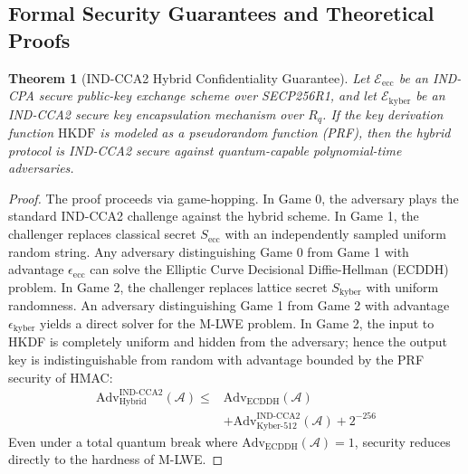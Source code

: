 \documentclass[pdflatex,sn-mathphys,Numbered]{sn-jnl}%
\theoremstyle{thmstyleone}%
\newtheorem{theorem}{Theorem}%
\theoremstyle{thmstyletwo}%
\theoremstyle{thmstylethree}%
\begin{document}
\subsection{\textbf{Formal Security Guarantees and Theoretical Proofs}}

\begin{theorem}[IND-CCA2 Hybrid Confidentiality Guarantee]
Let $\mathcal{E}_{\text{ecc}}$ be an IND-CPA secure public-key exchange scheme over SECP256R1, and let $\mathcal{E}_{\text{kyber}}$ be an IND-CCA2 secure key encapsulation mechanism over $R_q$. If the key derivation function $\text{HKDF}$ is modeled as a pseudorandom function (PRF), then the hybrid protocol is IND-CCA2 secure against quantum-capable polynomial-time adversaries.
\end{theorem}
\begin{proof}
The proof proceeds via game-hopping. In Game 0, the adversary plays the standard IND-CCA2 challenge against the hybrid scheme. In Game 1, the challenger replaces classical secret $S_{\text{ecc}}$ with an independently sampled uniform random string. Any adversary distinguishing Game 0 from Game 1 with advantage $\epsilon_{\text{ecc}}$ can solve the Elliptic Curve Decisional Diffie-Hellman (ECDDH) problem. In Game 2, the challenger replaces lattice secret $S_{\text{kyber}}$ with uniform randomness. An adversary distinguishing Game 1 from Game 2 with advantage $\epsilon_{\text{kyber}}$ yields a direct solver for the M-LWE problem. In Game 2, the input to HKDF is completely uniform and hidden from the adversary; hence the output key is indistinguishable from random with advantage bounded by the PRF security of HMAC:
\begin{equation}
\begin{split}
\text{Adv}_{\text{Hybrid}}^{\text{IND-CCA2}}(\mathcal{A}) \le {} & \text{Adv}_{\text{ECDDH}}(\mathcal{A}) \\
& + \text{Adv}_{\text{Kyber-512}}^{\text{IND-CCA2}}(\mathcal{A}) + 2^{-256}
\end{split}
\end{equation}
Even under a total quantum break where $\text{Adv}_{\text{ECDDH}}(\mathcal{A}) = 1$, security reduces directly to the hardness of M-LWE.
\end{proof}
\end{document}
